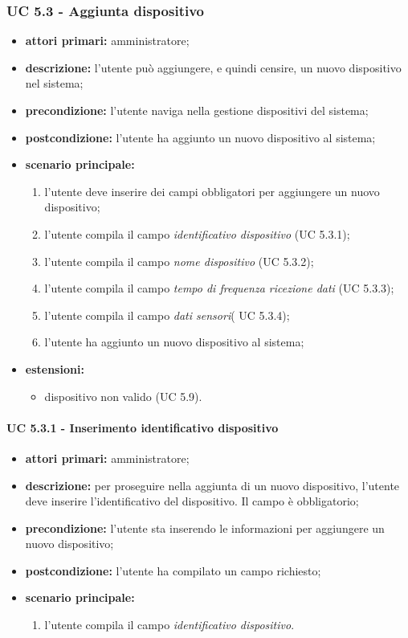 			\subsubsection{UC 5.3 - Aggiunta dispositivo}
			\begin{itemize}
				\item \textbf{attori primari:} amministratore;
				\item \textbf{descrizione:} l'utente può aggiungere, e quindi censire, un nuovo dispositivo nel sistema;
				\item \textbf{precondizione:} l'utente naviga nella gestione dispositivi del sistema;
				\item \textbf{postcondizione:} l'utente ha aggiunto un nuovo dispositivo al sistema;
				\item \textbf{scenario principale:}
				\begin{enumerate}
					\item{l'utente deve inserire dei campi obbligatori per aggiungere un nuovo dispositivo;}
					\item{l'utente compila il campo \textit{identificativo dispositivo} (UC 5.3.1);}
					\item{l'utente compila il campo \textit{nome dispositivo} (UC 5.3.2);}
					\item{l'utente compila il campo \textit{tempo di frequenza ricezione dati} (UC 5.3.3);}
					\item{l'utente compila il campo \textit{dati sensori}( UC 5.3.4);}
					\item{l'utente ha aggiunto un nuovo dispositivo al sistema;}
				\end{enumerate}
				\item \textbf{estensioni:}
				\begin{itemize}
					\item dispositivo non valido (UC 5.9).
				\end{itemize}
			\end{itemize}

				\paragraph{UC 5.3.1 - Inserimento identificativo dispositivo}
				\begin{itemize}
					\item \textbf{attori primari:} amministratore;
					\item \textbf{descrizione:} per proseguire nella aggiunta di un nuovo dispositivo, l'utente deve inserire l'identificativo del dispositivo. Il campo è obbligatorio;
					\item \textbf{precondizione:} l'utente sta inserendo le informazioni per aggiungere un nuovo dispositivo;
					\item \textbf{postcondizione:} l'utente ha compilato un campo richiesto;
					\item \textbf{scenario principale:}
					\begin{enumerate}
						\item{l'utente compila il campo \textit{identificativo dispositivo}.}
					\end{enumerate}
				\end{itemize}

